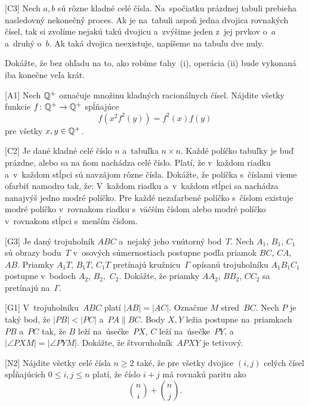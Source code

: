 {%
[C3] Nech $a,b$ sú rôzne kladné celé čísla. Na~spočiatku prázdnej tabuli prebieha nasledovný nekonečný proces.
 Ak je na~tabuli aspoň jedna dvojica rovnakých čísel, tak si zvolíme nejakú takú dvojicu a~zvýšime jeden z~jej prvkov o~$a$ a~druhý o~$b$.
 Ak taká dvojica neexistuje, napíšeme na tabuľu dve nuly. 

Dokážte, že bez ohľadu na to, ako robíme ťahy~(i), operácia (ii) bude vykonaná iba konečne veľa krát.
}

{%
[A1] Nech $\Bbb Q^{+}$ označuje množinu kladných racionálnych čísel. Nájdite všetky funkcie ${f\colon \Bbb Q^{+} \to \Bbb Q^{+}}$ spĺňajúce
$$
f\left(x^2f^2(y)\right)=f^2(x) f(y)
$$
pre všetky $x,y \in \Bbb Q^{+}$.
}

{%
[C2] Je dané kladné celé číslo $n$ a~tabuľka $n \times n$. Každé políčko tabuľky je buď prázdne, alebo sa na ňom nachádza celé číslo. Platí, že v~každom riadku a~v~každom stĺpci sú navzájom rôzne čísla. Dokážte, že políčka s~číslami vieme ofarbiť namodro tak, že:
 V~každom riadku a~v~každom stĺpci sa nachádza nanajvýš jedno modré políčko.
 Pre každé nezafarbené políčko s~číslom existuje modré políčko v~rovnakom riadku s~väčším číslom alebo modré políčko v~rovnakom stĺpci s~menším číslom.\endgraf
}

{%
[G3] Je daný trojuholník $ABC$ a~nejaký jeho vnútorný bod~$T$. Nech $A_1$, $B_1$, $C_1$ sú obrazy bodu~$T$ v~osových súmernostiach postupne podľa priamok $BC$, $CA$, $AB$. Priamky $A_1T$, $B_1T$, $C_1T$ pretínajú kružnicu~$\Gamma$ opísanú trojuholníku $A_1B_1C_1$ postupne v~bodoch $A_2$, $B_2,$ $C_2$. Dokážte, že priamky $AA_2$, $BB_2$, $CC_2$ sa pretínajú na~$\Gamma$.
}

{%
[G1] V~trojuholníku~$ABC$ platí $|AB|=|AC|$. Označme $M$ stred~$BC$. Nech $P$ je taký bod, že $|PB|<|PC|$ a~$PA \parallel BC$. Body $X,Y$ ležia postupne na~priamkach $PB$ a~$PC$ tak, že $B$ leží na~úsečke~$PX$, $C$ leží na~úsečke~$PY$, a~$|\angle PXM|=|\angle PYM|$. Dokážte, že štvoruholník~$APXY$ je tetivový.
}

{%
[N2] Nájdite všetky celé čísla $n \ge 2$ také, že pre všetky dvojice $(i,j)$ celých čísel spĺňajúcich $0 \leq i,j \leq n$ platí, že číslo $i+j$ má rovnakú paritu ako
$$
{n \choose i} + {n \choose j}.
$$
}

